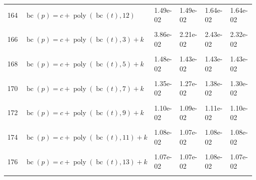 \documentclass[12pt,a4paper]{article}
\DeclareMathOperator{\bc}{bc}
\DeclareMathOperator{\poly}{poly}
\begin{document}
\begin{longtable}[t]{ll>{\raggedleft\arraybackslash}p{2cm}>{\raggedleft\arraybackslash}p{2cm}>{\raggedleft\arraybackslash}p{2cm}>{\raggedleft\arraybackslash}p{2cm}}
164 & $\bc(p) = c + \poly\left( \bc(t), 12 \right)$ & 1.49e-02 & 1.49e-02 & 1.64e-02 & 1.64e-02\\
\cellcolor{gray!6}{165} & \cellcolor{gray!6}{$\bc(p) = c + \poly\left( \bc(t), 13 \right)$} & \cellcolor{gray!6}{1.49e-02} & \cellcolor{gray!6}{1.49e-02} & \cellcolor{gray!6}{1.64e-02} & \cellcolor{gray!6}{1.64e-02}\\
166 & $\bc(p) = c + \poly\left( \bc(t), 3 \right) + k$ & 3.86e-02 & 2.21e-02 & 2.43e-02 & 2.32e-02\\
\cellcolor{gray!6}{167} & \cellcolor{gray!6}{$\bc(p) = c + \poly\left( \bc(t), 4 \right) + k$} & \cellcolor{gray!6}{2.90e-02} & \cellcolor{gray!6}{2.42e-02} & \cellcolor{gray!6}{2.70e-02} & \cellcolor{gray!6}{2.58e-02}\\
168 & $\bc(p) = c + \poly\left( \bc(t), 5 \right) + k$ & 1.48e-02 & 1.43e-02 & 1.43e-02 & 1.43e-02\\
\cellcolor{gray!6}{169} & \cellcolor{gray!6}{$\bc(p) = c + \poly\left( \bc(t), 6 \right) + k$} & \cellcolor{gray!6}{1.37e-02} & \cellcolor{gray!6}{1.28e-02} & \cellcolor{gray!6}{1.40e-02} & \cellcolor{gray!6}{1.31e-02}\\
170 & $\bc(p) = c + \poly\left( \bc(t), 7 \right) + k$ & 1.35e-02 & 1.27e-02 & 1.38e-02 & 1.30e-02\\
\cellcolor{gray!6}{171} & \cellcolor{gray!6}{$\bc(p) = c + \poly\left( \bc(t), 8 \right) + k$} & \cellcolor{gray!6}{1.10e-02} & \cellcolor{gray!6}{1.09e-02} & \cellcolor{gray!6}{1.11e-02} & \cellcolor{gray!6}{1.10e-02}\\
172 & $\bc(p) = c + \poly\left( \bc(t), 9 \right) + k$ & 1.10e-02 & 1.09e-02 & 1.11e-02 & 1.10e-02\\
\cellcolor{gray!6}{173} & \cellcolor{gray!6}{$\bc(p) = c + \poly\left( \bc(t), 10 \right) + k$} & \cellcolor{gray!6}{1.08e-02} & \cellcolor{gray!6}{1.07e-02} & \cellcolor{gray!6}{1.08e-02} & \cellcolor{gray!6}{1.08e-02}\\
174 & $\bc(p) = c + \poly\left( \bc(t), 11 \right) + k$ & 1.08e-02 & 1.07e-02 & 1.08e-02 & 1.08e-02\\
\cellcolor{gray!6}{175} & \cellcolor{gray!6}{$\bc(p) = c + \poly\left( \bc(t), 12 \right) + k$} & \cellcolor{gray!6}{1.07e-02} & \cellcolor{gray!6}{1.07e-02} & \cellcolor{gray!6}{1.08e-02} & \cellcolor{gray!6}{1.07e-02}\\
176 & $\bc(p) = c + \poly\left( \bc(t), 13 \right) + k$ & 1.07e-02 & 1.07e-02 & 1.08e-02 & 1.07e-02\\
\cellcolor{gray!6}{177} & \cellcolor{gray!6}{$\bc(p) = c + \poly\left( \bc(t), 3 \right) * k$} & \cellcolor{gray!6}{3.67e-02} & \cellcolor{gray!6}{1.89e-02} & \cellcolor{gray!6}{2.13e-02} & \cellcolor{gray!6}{2.02e-02}\\

\end{longtable}
\end{document}
